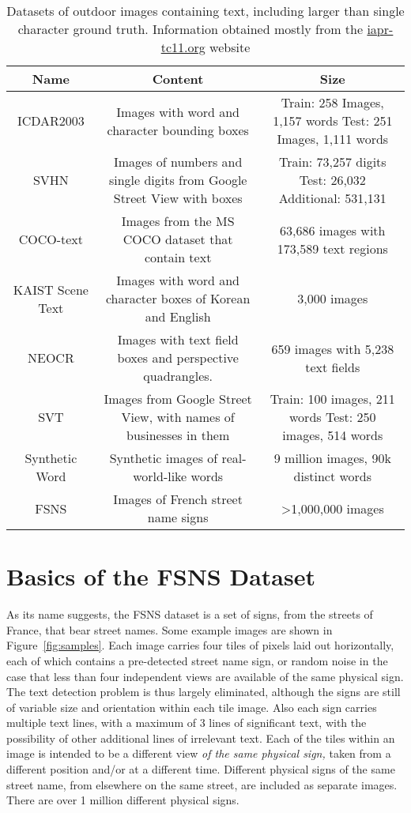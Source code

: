\documentclass[runningheads]{llncs}
\begin{document}
\begin{table}
\begin{center}
\caption{Datasets of outdoor images containing text, including larger than single character ground truth. Information obtained mostly from the \href{http://www.iapr-tc11.org/mediawiki/index.php/Datasets}{iapr-tc11.org} website}
\label{table:datasets}
{\scriptsize
\begin{tabulary}{\linewidth}{ | C | C | C |}
\hline
Name & Content & Size \\ \hline \hline 
ICDAR2003 \cite{lucas2005icdar} & Images with word and character bounding boxes & Train: 258 Images, 1,157 words Test: 251 Images, 1,111 words \\ \hline
SVHN \cite{netzer2011reading} & Images of numbers and single digits from Google Street View with boxes & Train: 73,257 digits Test: 26,032 Additional: 531,131 \\ \hline
COCO-text \cite{veit2016coco} & Images from the MS COCO dataset that contain text & 63,686 images with 173,589 text regions \\ \hline
KAIST \cite{jung2011touch} Scene Text & Images with word and character boxes of Korean and English & 3,000 images\\ \hline 
NEOCR \cite{nagy2011neocr} & Images with text field boxes and perspective quadrangles. & 659 images with 5,238 text fields\\ \hline 
SVT \cite{wang2011end} & Images from Google Street View, with names of businesses in them & Train: 100 images, 211 words Test: 250 images, 514 words \\ \hline
Synthetic Word \cite{Jaderberg14c} & Synthetic images of real-world-like words & 9 million images, 90k distinct words \\ \hline
FSNS & Images of French street name signs & \textgreater 1,000,000 images \\ \hline
\end{tabulary}
}
\end{center}
\end{table}
\section{Basics of the FSNS Dataset}
As its name suggests, the FSNS dataset is a set of signs, from the streets of France, that bear street
 names. Some example images are shown in Figure~\ref{fig:samples}. Each image carries four tiles of
  pixels laid out horizontally, each of which contains a pre-detected street name sign,
 or random noise in the case that less than four independent views are available of the same physical
 sign. The text detection problem is thus largely eliminated, although the signs are still of variable
 size and orientation within each tile image. Also each sign carries multiple text lines, with a maximum
 of 3 lines of significant text, with the possibility of other additional lines of irrelevant text. Each
 of the tiles within an image is intended to be a different view {\it of the same physical sign,} taken
 from a different position and/or at a different time. Different physical signs of the same street name,
 from elsewhere on the same street, are included as separate images. There are over 1 million different
 physical signs.
\end{document}
